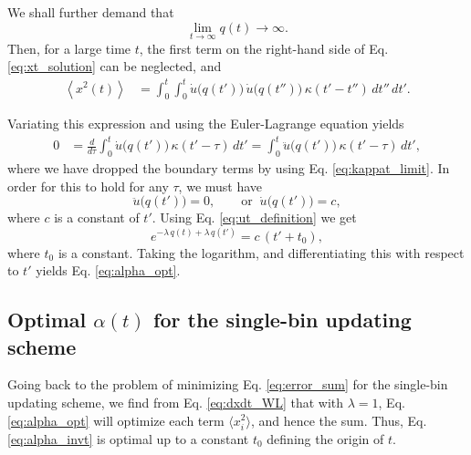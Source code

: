 \documentclass[reprint]{revtex4-1}
\begin{document}
We shall further demand that
%
\begin{equation}
  \lim_{t \to \infty} q(t) \to \infty.
  \label{eq:qt_limit}
\end{equation}
%
Then, for a large time $t$,
the first term on the right-hand side
of Eq. \eqref{eq:xt_solution} can be neglected, and
%
\begin{align}
\left\langle x^2(t) \right\rangle
&=
\int_0^t \int_0^t
  \dot u\bigl( q(t') \bigr) \,
  \dot u\bigl( q(t'') \bigr) \,
  \kappa(t' - t'') \, dt'' \, dt'.
\label{eq:x2t_average}
\end{align}



Variating this expression and
using the Euler-Lagrange equation yields
$$
\begin{aligned}
0
&=
\frac{d}{d\tau} \int_0^t
  \dot u\bigl( q(t') \bigr) \, \kappa(t' - \tau) \, dt'
= \int_0^t
  \ddot u\bigl( q(t') \bigr) \, \kappa(t' - \tau) \, dt',
\end{aligned}
$$
where we have dropped the boundary terms
by using Eq. \eqref{eq:kappat_limit}.
%
%
In order for this to hold for any $\tau$,
we must have
%
\begin{equation}
\ddot u\bigl( q(t') \bigr) = 0,
\qquad
\mathrm{or}
\;\;
\dot u\bigl( q(t') \bigr) = c,
\label{eq:ddu_eq_0}
\end{equation}
%
where $c$ is a constant of $t'$.
%
Using Eq. \eqref{eq:ut_definition}
we get
$$
e^{-\lambda \, q(t) + \lambda \, q(t')}
=
c \, (t' + t_0),
$$
where $t_0$ is a constant.
%
Taking the logarithm, and differentiating this with respect to $t'$
yields Eq. \eqref{eq:alpha_opt}.



\subsection{Optimal $\alpha(t)$ for the single-bin updating scheme}



Going back to the problem of
minimizing Eq. \eqref{eq:error_sum}
for the single-bin updating scheme,
we find from Eq. \eqref{eq:dxdt_WL}
that with $\lambda = 1$,
Eq. \eqref{eq:alpha_opt}
will optimize each term $\langle x_i^2 \rangle$,
and hence the sum.
%
Thus, Eq. \eqref{eq:alpha_invt} is optimal
up to a constant $t_0$ defining the origin of $t$.
\end{document}
